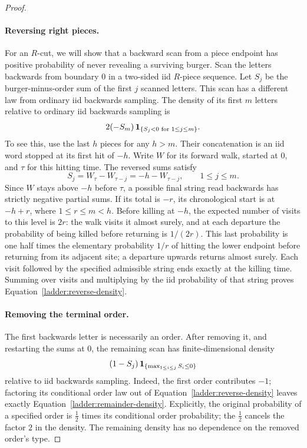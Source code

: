 \begin{proof}
\paragraph{Reversing right pieces.}
For an $R$-cut, we will show that a backward scan from a piece endpoint
has positive probability of never revealing a surviving burger.
Scan the letters backwards from boundary $0$ in a two-sided iid
$R$-piece sequence. Let $S_j$ be the burger-minus-order sum of the first
$j$ scanned letters. This scan has a different law from ordinary iid
backwards sampling.
The density of its first $m$ letters relative to ordinary iid backwards
sampling is
\begin{equation}
 2(-S_m)\,\mathbf 1_{\{S_j<0\text{ for }1\le j\le m\}}.
 \label{ladder:reverse-density}
\end{equation}
To see this, use the last $h$ pieces for any $h>m$.
Their concatenation is an iid word stopped at its first hit of $-h$.
Write $W$ for its forward walk, started at $0$, and $\tau$ for this
hitting time. The reversed sums satisfy
\[
 S_j=W_\tau-W_{\tau-j}=-h-W_{\tau-j},\qquad 1\le j\le m.
\]
Since $W$ stays above $-h$ before $\tau$, a possible final string read
backwards has strictly negative partial sums.
If its total is $-r$, its chronological start is at
$-h+r$, where $1\le r\le m<h$.
Before killing at $-h$, the expected number of visits to this level is
$2r$: the walk visits it almost surely, and at each departure the
probability of being killed before returning is $1/(2r)$.
This last probability is one half times the elementary probability
$1/r$ of hitting the lower endpoint before returning from its adjacent
site; a departure upwards returns almost surely.
Each visit followed by the specified admissible string ends exactly at
the killing time. Summing over visits and multiplying by the iid
probability of that string proves Equation~\eqref{ladder:reverse-density}.

\paragraph{Removing the terminal order.}
The first backwards letter is necessarily an order.
After removing it, and restarting the sums at $0$, the remaining scan
has finite-dimensional density
\begin{equation}
 (1-S_j)\,\mathbf 1_{\{\max_{1\le i\le j}S_i\le0\}}
 \label{ladder:remainder-density}
\end{equation}
relative to iid backwards sampling.
Indeed, the first order contributes $-1$; factoring its conditional order
law out of Equation~\eqref{ladder:reverse-density} leaves exactly
Equation~\eqref{ladder:remainder-density}. Explicitly, the original
probability of a specified order is $\tfrac12$ times its conditional
order probability; the $\tfrac12$ cancels the factor $2$ in the density.
The remaining density has no dependence on the removed order's type.


\end{proof}
